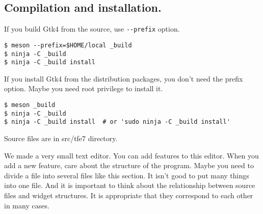 \hypertarget{compilation-and-installation.}{%
\subsection{Compilation and
installation.}\label{compilation-and-installation.}}

If you build Gtk4 from the source, use
\passthrough{\lstinline!--prefix!} option.

\begin{lstlisting}
$ meson --prefix=$HOME/local _build
$ ninja -C _build
$ ninja -C _build install
\end{lstlisting}

If you install Gtk4 from the distribution packages, you don't need the
prefix option. Maybe you need root privilege to install it.

\begin{lstlisting}
$ meson _build
$ ninja -C _build
$ ninja -C _build install  # or 'sudo ninja -C _build install'
\end{lstlisting}

Source files are in src/tfe7 directory.

We made a very small text editor. You can add features to this editor.
When you add a new feature, care about the structure of the program.
Maybe you need to divide a file into several files like this section. It
isn't good to put many things into one file. And it is important to
think about the relationship between source files and widget structures.
It is appropriate that they correspond to each other in many cases.
